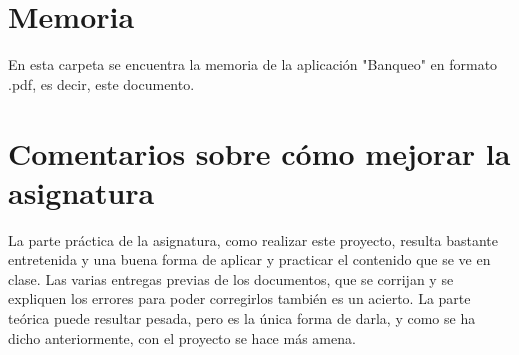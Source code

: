 \section{Memoria}
En esta carpeta se encuentra la memoria de la aplicación "Banqueo" en formato .pdf, es decir, este documento.

\section*{Comentarios sobre cómo mejorar la asignatura}
La parte práctica de la asignatura, como realizar este proyecto, resulta bastante entretenida y una buena forma de aplicar y practicar el contenido que se ve en clase. Las varias entregas previas de los documentos, que se corrijan y se expliquen los errores para poder corregirlos también es un acierto.
La parte teórica puede resultar pesada, pero es la única forma de darla, y como se ha dicho anteriormente, con el proyecto se hace más amena.

